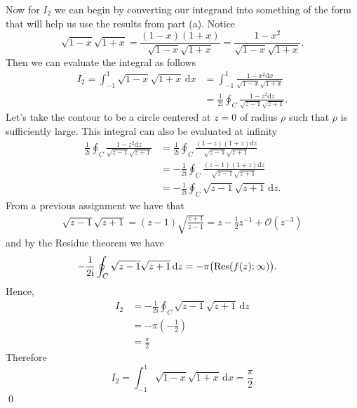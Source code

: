 \documentclass[10pt]{amsart}
\newcommand{\D}{\mathrm{d}}
\newcommand{\I}{\mathrm{i}}
\theoremstyle{nonumberplain}
\begin{document}
\begin{enumerate}[label={\bf {\arabic*}:}]
\begin{enumerate}
\noindent
Now for $I_2$ we can begin by converting our integrand into something of the form that will help us use the results from part (a). Notice
$$
\sqrt{1 - x} \sqrt{1 + x} = \frac{(1 - x)(1 + x)}{\sqrt{1 - x} \sqrt{1 + x}} = \frac{1 - x^2}{\sqrt{1 - x} \sqrt{1 + x}}.
$$
Then we can evaluate the integral as follows
\begin{align*}
I_2 = \int_{-1}^1 \sqrt{1 -x} \sqrt{1 + x}\, \D x &= \int_{-1}^1 \frac{1 - x^2 \D x}{\sqrt{1 - x} \sqrt{1 + x}} \\
	&= \frac{1}{2\I} \oint_C \frac{1 - z^2\D z}{\sqrt{z -1} \sqrt{z + 1}}.
\end{align*}
Let's take the contour to be a circle centered at $z=0$ of radius $\rho$ such that $\rho$ is sufficiently large.
This integral can also be evaluated at infinity
\begin{align*} 
\frac{1}{2\I} \oint_C \frac{1 - z^2\D z}{\sqrt{z -1} \sqrt{z + 1}} 
	&= \frac{1}{2\I} \oint_C \frac{(1 - z)(1 + z)\D z}{\sqrt{z -1} \sqrt{z + 1}} \\
	&= - \frac{1}{2\I} \oint_C \frac{(z - 1)(1 + z)\D z}{\sqrt{z -1} \sqrt{z + 1}} \\
	&= - \frac{1}{2\I} \oint_C \sqrt{z -1} \sqrt{z + 1}\, \D z.
\end{align*}
From a previous assignment we have that 
\begin{align}
\sqrt{z -1} \sqrt{z + 1} = (z - 1) \sqrt{ \frac {z + 1}{z - 1} } = z - \frac 1 2 z^{-1} + \mathcal O(z^{-3})
\label{eq:taylor_previous}
\end{align}
and by the Residue theorem we have
\begin{align*}
- \frac{1}{2\I} \oint_C \sqrt{z -1} \sqrt{z + 1}\, \D z
	&= -\pi \big( {\rm Res}( f(z); \infty) \big).
\end{align*}
Hence,
\begin{align*}
I_2 &= - \frac{1}{2\I} \oint_C \sqrt{z -1} \sqrt{z + 1}\, \D z \\
	&= -\pi \left( - \frac 1 2 \right) \\
	&= \frac \pi 2
\end{align*}
Therefore
$$
I_2 = \int_{-1}^1 \sqrt{1 -x} \sqrt{1 + x}\, \D x = \frac \pi 2
$$ \qed \\


\end{enumerate}
\end{enumerate}
\end{document}

